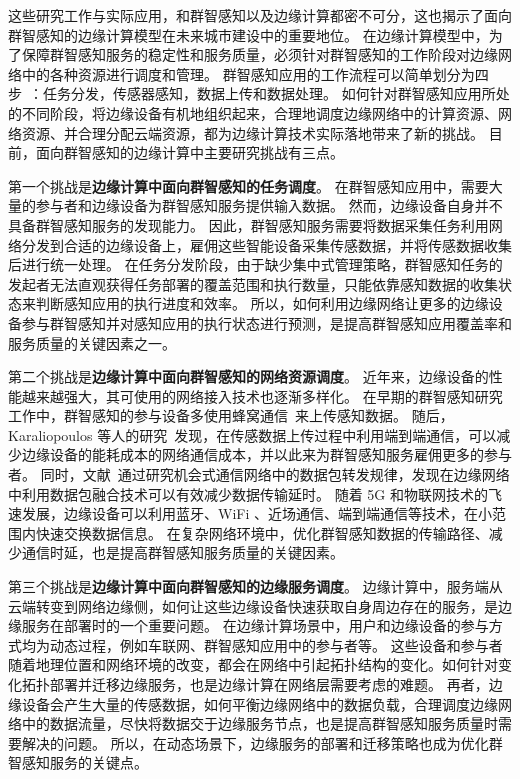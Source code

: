 这些研究工作与实际应用，和群智感知以及边缘计算都密不可分，这也揭示了面向群智感知的边缘计算模型在未来城市建设中的重要地位。
在边缘计算模型中，为了保障群智感知服务的稳定性和服务质量，必须针对群智感知的工作阶段对边缘网络中的各种资源进行调度和管理。
群智感知应用的工作流程可以简单划分为四步~\cite{zh_cn:shi}：任务分发，传感器感知，数据上传和数据处理。
如何针对群智感知应用所处的不同阶段，将边缘设备有机地组织起来，合理地调度边缘网络中的计算资源、网络资源、并合理分配云端资源，都为边缘计算技术实际落地带来了新的挑战。
目前，面向群智感知的边缘计算中主要研究挑战有三点。

第一个挑战是\textbf{边缘计算中面向群智感知的任务调度}。
在群智感知应用中，需要大量的参与者和边缘设备为群智感知服务提供输入数据。
然而，边缘设备自身并不具备群智感知服务的发现能力。
因此，群智感知服务需要将数据采集任务利用网络分发到合适的边缘设备上，雇佣这些智能设备采集传感数据，并将传感数据收集后进行统一处理。
在任务分发阶段，由于缺少集中式管理策略，群智感知任务的发起者无法直观获得任务部署的覆盖范围和执行数量，只能依靠感知数据的收集状态来判断感知应用的执行进度和效率。
所以，如何利用边缘网络让更多的边缘设备参与群智感知并对感知应用的执行状态进行预测，是提高群智感知应用覆盖率和服务质量的关键因素之一。

第二个挑战是\textbf{边缘计算中面向群智感知的网络资源调度}。
近年来，边缘设备的性能越来越强大，其可使用的网络接入技术也逐渐多样化。
在早期的群智感知研究工作中，群智感知的参与设备多使用蜂窝通信~\cite{DBLP:conf/globecom/ZhangJLLC16,DBLP:conf/icdcs/XiaoWHHH16}来上传感知数据。
随后，Karaliopoulos 等人的研究~\cite{DBLP:conf/infocom/KaraliopoulosTK15}发现，在传感数据上传过程中利用端到端通信，可以减少边缘设备的能耗成本的网络通信成本，并以此来为群智感知服务雇佣更多的参与者。
同时，文献~\cite{DBLP:journals/tpds/ZhaoMTL15}通过研究机会式通信网络中的数据包转发规律，发现在边缘网络中利用数据包融合技术可以有效减少数据传输延时。
随着 5G 和物联网技术的飞速发展，边缘设备可以利用蓝牙、WiFi 、近场通信、端到端通信等技术，在小范围内快速交换数据信息。
在复杂网络环境中，优化群智感知数据的传输路径、减少通信时延，也是提高群智感知服务质量的关键因素。

第三个挑战是\textbf{边缘计算中面向群智感知的边缘服务调度}。
边缘计算中，服务端从云端转变到网络边缘侧，如何让这些边缘设备快速获取自身周边存在的服务，是边缘服务在部署时的一个重要问题。
在边缘计算场景中，用户和边缘设备的参与方式均为动态过程，例如车联网、群智感知应用中的参与者等。
这些设备和参与者随着地理位置和网络环境的改变，都会在网络中引起拓扑结构的变化。如何针对变化拓扑部署并迁移边缘服务，也是边缘计算在网络层需要考虑的难题。
再者，边缘设备会产生大量的传感数据，如何平衡边缘网络中的数据负载，合理调度边缘网络中的数据流量，尽快将数据交于边缘服务节点，也是提高群智感知服务质量时需要解决的问题。
所以，在动态场景下，边缘服务的部署和迁移策略也成为优化群智感知服务的关键点。



